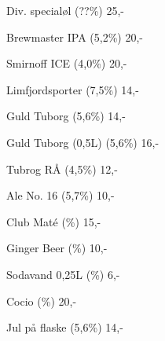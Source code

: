 \documentclass{article}
\begin{document}

\maketitle

\null
\vspace{-0.8cm}


\vspace{0.3cm}

Div. specialøl {\large (??\%)}  \hfill 25,-

\vspace{0.3cm}

Brewmaster IPA {\large (5,2\%)} \hfill 20,-

\vspace{0.3cm}

Smirnoff ICE {\large (4,0\%)}  \hfill 20,-

\vspace{1.3cm}

Limfjordsporter {\large (7,5\%)}  \hfill 14,-





\vspace{1.3cm}

Guld Tuborg {\large (5,6\%)} \hfill 14,-

\vspace{0.3cm}

Guld Tuborg (0,5L) {\large (5,6\%)} \hfill 16,-

\vspace{0.3cm}

Tubrog RÅ {\large (4,5\%)} \hfill 12,-

\vspace{0.3cm}

Ale No. 16 {\large (5,7\%)} \hfill 10,-

\vspace{1.3cm}

Club Maté {\large (\frownie{}\%)} \hfill 15,-

\vspace{0.3cm}

Ginger Beer {\large (\frownie{}\%)} \hfill 10,-

\vspace{0.3cm}

Sodavand 0,25L {\large (\frownie{}\%)}  \hfill 6,-

\vspace{0.3cm}

Cocio {\large (\frownie{}\%)}  \hfill 20,-

\vspace{0.5cm}

Jul på flaske {\large (5,6\%)} \hfill 14,-

\underskriv
\end{document}
